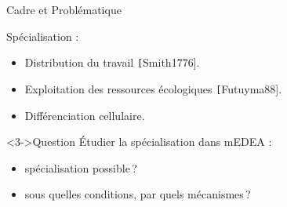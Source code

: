 \documentclass[8pt, handout=show,notes=show]{beamer}
\begin{document}
	
	
	\begin{frame}{Cadre et Problématique}
			 
			Spécialisation :
			\begin{itemize}
			 \item Distribution du travail {\scriptsize \texttt [Smith1776]}.
			 \item \alert<2->{Exploitation des ressources écologiques}  {\scriptsize \texttt [Futuyma88]}.
			 \item Différenciation cellulaire.
			\end{itemize}
			
			\vfill


% 
			
			

			\begin{alertblock}<3->{Question}
			\'{E}tudier la spécialisation dans mEDEA :
			\begin{itemize}
			 \item spécialisation possible\,?
			 \item sous quelles conditions, par quels mécanismes\,?
			\end{itemize}
			\end{alertblock}


	\end{frame}
	
\end{document}
